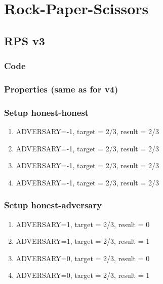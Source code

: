 \documentclass{article}
\begin{document}
\javastyle

\section{Rock-Paper-Scissors}

\subsection{RPS v3}

\subsubsection{Code}



\subsubsection{Properties (same as for v4)}



\subsubsection{Setup honest-honest}

\begin{enumerate}
\item ADVERSARY=-1, target = 2/3, result = 2/3
\item ADVERSARY=-1, target = 2/3, result = 2/3
\item ADVERSARY=-1, target = 2/3, result = 2/3
\item ADVERSARY=-1, target = 2/3, result = 2/3
\end{enumerate}

\subsubsection{Setup honest-adversary}

\begin{enumerate}
\item ADVERSARY=1, target = 2/3, result = 0
\item ADVERSARY=1, target = 2/3, result = 1
\item ADVERSARY=0, target = 2/3, result = 0
\item ADVERSARY=0, target = 2/3, result = 1
\end{enumerate}
\end{document}
